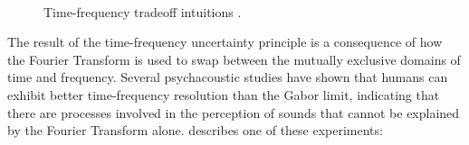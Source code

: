 \documentclass[report.tex]{subfiles}
\begin{document}
\begin{figure}[ht]
	\centering
	\\
	\caption{Time-frequency tradeoff intuitions \parencite[103, 106]{gabor2}.}
	\label{fig:gaborfirst}
\end{figure}

The result of the time-frequency uncertainty principle is a consequence of how the Fourier Transform is used to swap between the mutually exclusive domains of time and frequency. Several psychacoustic studies have shown that humans can exhibit better time-frequency resolution than the Gabor limit, indicating that there are processes involved in the perception of sounds that cannot be explained by the Fourier Transform alone. \citeauthor{psycho2} describes one of these experiments:
\end{document}
